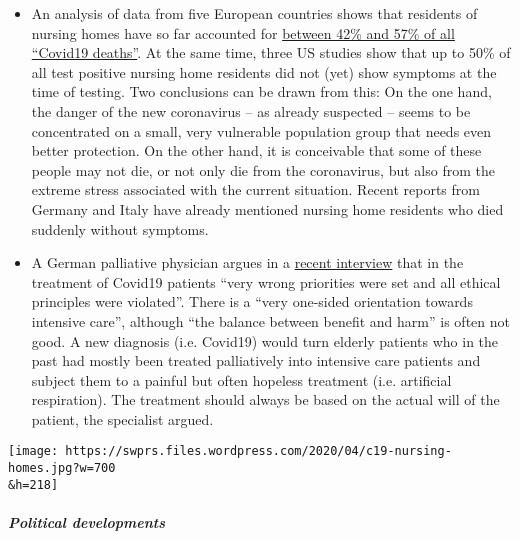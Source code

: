 \begin{itemize}
\tightlist
\item
  An analysis of data from five European countries shows that residents
  of nursing homes have so far accounted for
  \href{https://ltccovid.org/2020/04/12/mortality-associated-with-covid-19-outbreaks-in-care-homes-early-international-evidence/}{between
  42\% and 57\% of all ``Covid19 deaths''}. At the same time, three US
  studies show that up to 50\% of all test positive nursing home
  residents did not (yet) show symptoms at the time of testing. Two
  conclusions can be drawn from this: On the one hand, the danger of the
  new coronavirus -- as already suspected -- seems to be concentrated on
  a small, very vulnerable population group that needs even better
  protection. On the other hand, it is conceivable that some of these
  people may not die, or not only die from the coronavirus, but also
  from the extreme stress associated with the current situation. Recent
  reports from Germany and Italy have already mentioned nursing home
  residents who died suddenly without symptoms.
\item
  A German palliative physician argues in a
  \href{https://www.deutschlandfunk.de/palliativmediziner-zu-covid-19-behandlungen-sehr-falsche.694.de.html?dram:article_id=474488}{recent
  interview} that in the treatment of Covid19 patients ``very wrong
  priorities were set and all ethical principles were violated''. There
  is a ``very one-sided orientation towards intensive care'', although
  ``the balance between benefit and harm'' is often not good. A new
  diagnosis (i.e. Covid19) would turn elderly patients who in the past
  had mostly been treated palliatively into intensive care patients and
  subject them to a painful but often hopeless treatment (i.e.
  artificial respiration). The treatment should always be based on the
  actual will of the patient, the specialist argued.
\end{itemize}

\texttt{[image: https://swprs.files.wordpress.com/2020/04/c19-nursing-homes.jpg?w=700\\\&h=218]}

\hypertarget{political-developments}{%
\subparagraph{\texorpdfstring{\textbf{Political
developments}}{Political developments}}\label{political-developments}}

